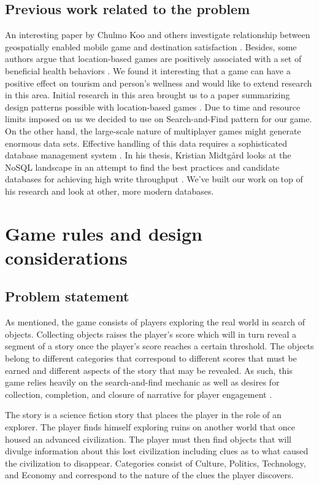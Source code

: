 \documentclass[conference]{IEEEtran}
\begin{document}
\subsection{Previous work related to the problem}
An interesting paper by Chulmo Koo and others investigate relationship between geospatially enabled mobile game and destination satisfaction \cite{destination-engagement}. Besides, some authors argue that location-based games are positively associated with a set of beneficial health behaviors \cite{pokemon-motivation}. We found it interesting that a game can have a positive effect on tourism and person’s wellness and would like to extend research in this area.  
   Initial research in this area brought us to a paper summarizing design patterns possible with location-based games \cite{location-based-mg}. Due to time and resource limits imposed on us we decided to use on Search-and-Find pattern for our game. On the other hand, the large-scale nature of multiplayer games might generate enormous data sets. Effective handling of this data requires a sophisticated database management system \cite{data-store-issues, location-based-services}. In his thesis, Kristian Midtgård looks at the NoSQL landscape in an attempt to find the best practices and candidate databases for achieving high write throughput \cite{massive-amounts-location-data}. We've built our work on top of his research and look at other, more modern databases. 

\section{Game rules and design considerations}
\subsection{Problem statement}
As mentioned, the game consists of players exploring the real world in search of objects. Collecting objects raises the player’s score which will in turn reveal a segment of a story once the player’s score reaches a certain threshold. The objects belong to different categories that correspond to different scores that must be earned and different aspects of the story that may be revealed. As such, this game relies heavily on the search-and-find mechanic as well as desires for collection, completion, and closure of narrative for player engagement \cite{game-methodology, location-based-games}. 

The story is a science fiction story that places the player in the role of an explorer. The player finds himself exploring ruins on another world that once housed an advanced civilization. The player must then find objects that will divulge information about this lost civilization including clues as to what caused the civilization to disappear. Categories consist of Culture, Politics, Technology, and Economy and correspond to the nature of the clues the player discovers.
\end{document}
